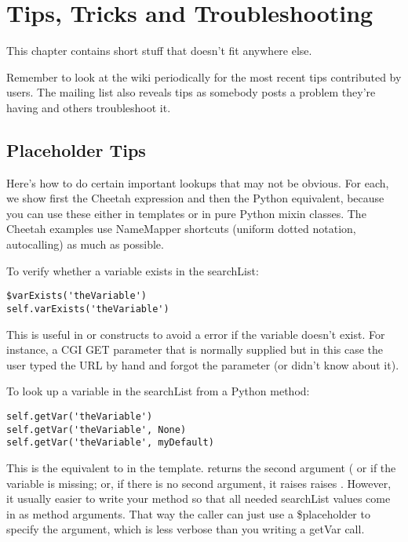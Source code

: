\section{Tips, Tricks and Troubleshooting}
\label{tips}

This chapter contains short stuff that doesn't fit anywhere else.

Remember to look at the wiki periodically for the most recent tips contributed
by users.  The mailing list also reveals tips as somebody posts a problem
they're having and others troubleshoot it.

\subsection{Placeholder Tips}
\label{tips.placeholder}

Here's how to do certain important lookups that may not be obvious.
For each, we show first the Cheetah expression and then the Python equivalent,
because you can use these either in templates or in pure Python mixin classes.
The Cheetah examples use NameMapper shortcuts (uniform dotted notation, 
autocalling) as much as possible.

To verify whether a variable exists in the searchList:
\begin{verbatim}
$varExists('theVariable')
self.varExists('theVariable')
\end{verbatim}
This is useful in  or  constructs to avoid a
 error if the variable doesn't exist.  For instance,
a CGI GET parameter that is normally supplied but in this case the user typed
the URL by hand and forgot the parameter (or didn't know about it).

To look up a variable in the searchList from a Python method:
\begin{verbatim}
self.getVar('theVariable')
self.getVar('theVariable', None)
self.getVar('theVariable', myDefault)
\end{verbatim}
This is the equivalent to  in the template.  
returns the second argument ( or  if the variable is
missing; or, if there is no second argument, it raises raises
.  However, it usually easier to write your method
so that all needed searchList values come in as method arguments.  That way
the caller can just use a \$placeholder to specify the argument, which is
less verbose than you writing a getVar call.

